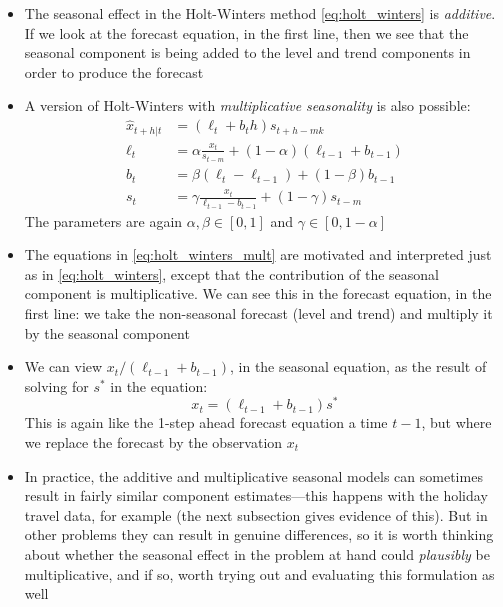 \documentclass{article}
\begin{document}
\begin{itemize}
\item The seasonal effect in the Holt-Winters method \eqref{eq:holt_winters} is
  \emph{additive}. If we look at the forecast equation, in the first line, then
  we see that the seasonal component is being added to the level and trend  
  components in order to produce the forecast 

\item A version of Holt-Winters with \emph{multiplicative seasonality} is also 
  possible: 
  \begin{equation}
  \label{eq:holt_winters_mult}
  \begin{aligned}
  \hat{x}_{t+h | t} &= (\ell_t + b_t h) s_{t+h-mk} \\   
  \ell_t &= \alpha \frac{x_t}{s_{t-m}} + (1-\alpha) (\ell_{t-1} + b_{t-1}) \\ 
  b_t &= \beta (\ell_t - \ell_{t-1}) + (1-\beta) b_{t-1} \\
  s_t &= \gamma \frac{x_t}{\ell_{t-1} - b_{t-1}} + (1-\gamma) s_{t-m} 
  \end{aligned}
  \end{equation}
  The parameters are again $\alpha, \beta \in [0,1]$ and $\gamma \in [0,
  1-\alpha]$  

\item The equations in \eqref{eq:holt_winters_mult} are motivated and
  interpreted just as in \eqref{eq:holt_winters}, except that the contribution 
  of the seasonal component is multiplicative. We can see this in the forecast
  equation, in the first line: we take the non-seasonal forecast (level and
  trend) and multiply it by the seasonal component  

\item We can view $x_t / (\ell_{t-1} +  b_{t-1})$, in the seasonal equation, as
  the result of solving for $s^*$ in the equation: 
  \[
  x_t = (\ell_{t-1} + b_{t-1}) s^*
  \]
  This is again like the 1-step ahead forecast equation a time $t-1$, but where
  we replace the forecast  by the observation $x_t$

\item In practice, the additive and multiplicative seasonal models can sometimes
  result in fairly similar component estimates---this happens with the holiday
  travel data, for example (the next subsection gives evidence of this). But in
  other problems they can result in genuine differences, so it is worth thinking
  about whether the seasonal effect in the problem at hand could
  \emph{plausibly} be multiplicative, and if so, worth trying out and evaluating
  this formulation as well 
\end{itemize}
\end{document}
